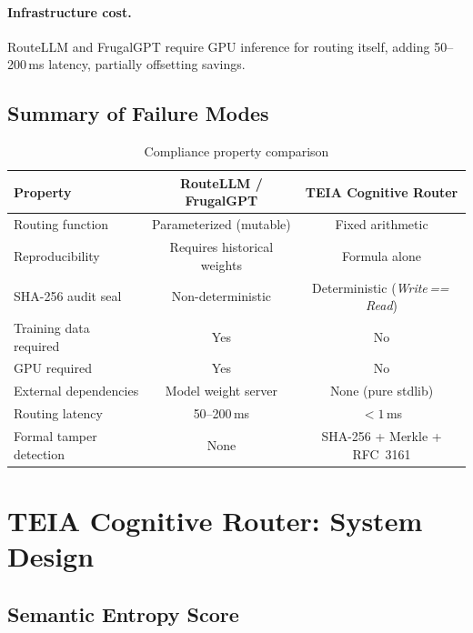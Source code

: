 \documentclass[11pt,a4paper]{article}
\newcommand{\teia}{\textsc{TEIA}}
\newcommand{\wwr}{\emph{Write\,==\,Read}}
\begin{document}
\paragraph{Infrastructure cost.}
RouteLLM and FrugalGPT require GPU inference for routing itself, adding
50--200\,ms latency, partially offsetting savings.

\subsection{Summary of Failure Modes}

\begin{table}[h]
\centering
\caption{Compliance property comparison}
\label{tab:compare}
\begin{tabular}{@{}lcc@{}}
\toprule
Property & RouteLLM / FrugalGPT & \teia{} Cognitive Router \\
\midrule
Routing function        & Parameterized (mutable)     & Fixed arithmetic         \\
Reproducibility         & Requires historical weights & Formula alone            \\
SHA-256 audit seal      & Non-deterministic           & Deterministic (\wwr{})   \\
Training data required  & Yes                         & No                       \\
GPU required            & Yes                         & No                       \\
External dependencies   & Model weight server         & None (pure stdlib)       \\
Routing latency         & 50--200\,ms                 & $< 1$\,ms                \\
Formal tamper detection & None                        & SHA-256 + Merkle + RFC~3161 \\
\bottomrule
\end{tabular}
\end{table}

\section{\teia{} Cognitive Router: System Design}
\label{sec:design}

\subsection{Semantic Entropy Score}
\end{document}
